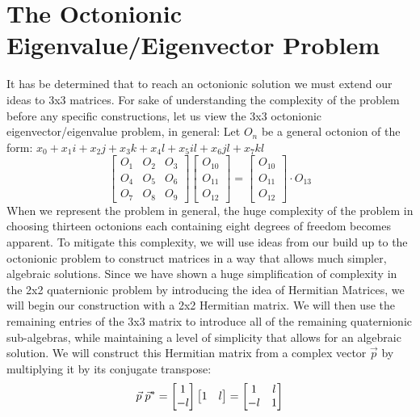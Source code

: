 \documentclass{article}
\theoremstyle{plain}
\begin{document}
\section{The Octonionic Eigenvalue/Eigenvector Problem}
It has be determined that to reach an octonionic solution we must extend our ideas to 3x3 matrices. For sake of understanding the complexity of the problem before any specific constructions, let us view the 3x3 octonionic eigenvector/eigenvalue problem, in general:\newline \newline
Let $O_n$ be a general octonion of the form:   $x_0+x_1i+x_2j+x_3k+x_4l+x_5il+x_6jl+x_7kl$
$$
\begin{bmatrix}
O_1 & O_2 & O_3\\
O_4 & O_5 & O_6\\
O_7 & O_8 & O_9
\end{bmatrix}
\begin{bmatrix}
O_{10}\\
O_{11}\\
O_{12}
\end{bmatrix}=\begin{bmatrix}
O_{10}\\
O_{11}\\
O_{12}
\end{bmatrix}\cdot O_{13}
$$
When we represent the problem in general, the huge complexity of the problem in choosing thirteen octonions each containing eight degrees of freedom becomes apparent. To mitigate this complexity, we will use ideas from our build up to the octonionic problem to construct matrices in a way that allows much simpler, algebraic solutions. Since we have shown a huge simplification of complexity in the 2x2 quaternionic problem by introducing the idea of Hermitian Matrices, we will begin our construction with a 2x2 Hermitian matrix. We will then use the remaining entries of the 3x3 matrix to introduce all of the remaining quaternionic sub-algebras, while maintaining a level of simplicity that allows for an algebraic solution. We will construct this Hermitian matrix from a complex vector $\vec{p}$ by multiplying it by its conjugate transpose:
$$\vec{p}\hspace{1mm}\vec{p}^{*} = \begin{bmatrix}1\\-l\end{bmatrix}\begin{bmatrix}1 & l\end{bmatrix} = \begin{bmatrix}1 & l\\-l & 1\end{bmatrix}$$
\end{document}
